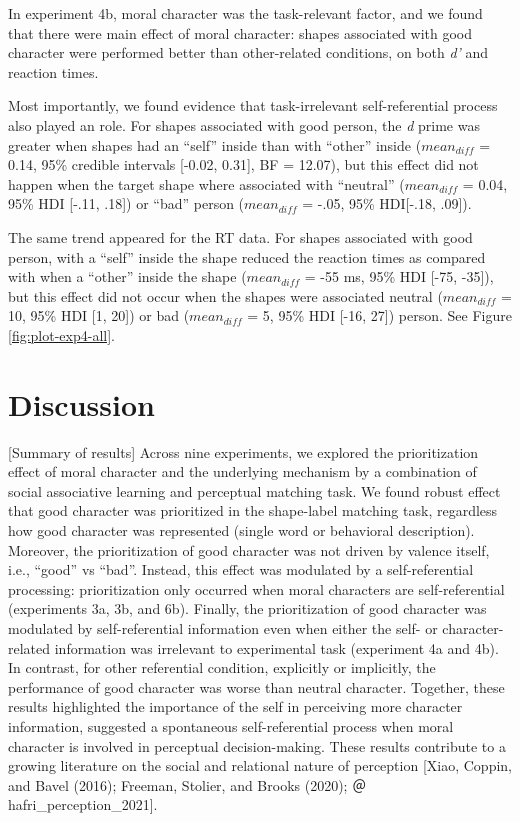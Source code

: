 \documentclass[
  man]{apa6}
\begin{document}
In experiment 4b, moral character was the task-relevant factor, and we found that there were main effect of moral character: shapes associated with good character were performed better than other-related conditions, on both \emph{d'} and reaction times.

Most importantly, we found evidence that task-irrelevant self-referential process also played an role. For shapes associated with good person, the \emph{d} prime was greater when shapes had an ``self'' inside than with ``other'' inside (\(mean_{diff}\) = 0.14, 95\% credible intervals {[}-0.02, 0.31{]}, BF = 12.07), but this effect did not happen when the target shape where associated with ``neutral'' (\(mean_{diff}\) = 0.04, 95\% HDI {[}-.11, .18{]}) or ``bad'' person (\(mean_{diff}\) = -.05, 95\% HDI{[}-.18, .09{]}).

The same trend appeared for the RT data. For shapes associated with good person, with a ``self'' inside the shape reduced the reaction times as compared with when a ``other'' inside the shape (\(mean_{diff}\) = -55 ms, 95\% HDI {[}-75, -35{]}), but this effect did not occur when the shapes were associated neutral (\(mean_{diff}\) = 10, 95\% HDI {[}1, 20{]}) or bad (\(mean_{diff}\) = 5, 95\% HDI {[}-16, 27{]}) person. See Figure \ref{fig:plot-exp4-all}.

\hypertarget{discussion}{%
\section{Discussion}\label{discussion}}

{[}Summary of results{]} Across nine experiments, we explored the prioritization effect of moral character and the underlying mechanism by a combination of social associative learning and perceptual matching task. We found robust effect that good character was prioritized in the shape-label matching task, regardless how good character was represented (single word or behavioral description). Moreover, the prioritization of good character was not driven by valence itself, i.e., ``good'' vs ``bad''. Instead, this effect was modulated by a self-referential processing: prioritization only occurred when moral characters are self-referential (experiments 3a, 3b, and 6b). Finally, the prioritization of good character was modulated by self-referential information even when either the self- or character- related information was irrelevant to experimental task (experiment 4a and 4b). In contrast, for other referential condition, explicitly or implicitly, the performance of good character was worse than neutral character. Together, these results highlighted the importance of the self in perceiving more character information, suggested a spontaneous self-referential process when moral character is involved in perceptual decision-making. These results contribute to a growing literature on the social and relational nature of perception {[}Xiao, Coppin, and Bavel (2016); Freeman, Stolier, and Brooks (2020); ＠hafri\_perception\_2021{]}.
\end{document}
